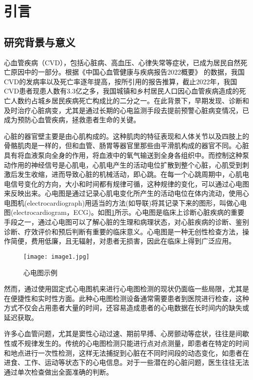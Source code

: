 \section{引言}
\subsection{研究背景与意义}

心血管疾病（CVD），包括心脏病、高血压、心律失常等症状，已成为居民自然死亡原因中的一部分。根据《中国心血管健康与疾病报告2022概要》 \cite{中国心血管健康与疾病报告2022概要} 的数据，我国CVD的发病率以及死亡率逐年提高，按所引用的报告推算，截止2022年，我国CVD患者现患人数有3.3亿之多，我国城镇和乡村居民人口因心血管疾病造成的死亡人数约占城乡居民疾病死亡构成比的二分之一。在此背景下，早期发现、诊断和及时治疗心脏病变，尤其是通过长期的心电监测手段去提前预警心脏病变情况，已成为预防心血管疾病，拯救患者生命的关键。

心脏的器官壁主要是由心肌构成的。这种肌肉的特征表现和人体关节以及四肢上的骨骼肌肉是一样的，但和血管、肠胃等器官里那些由平滑肌构成的器官不同。心脏具有将血液泵向全身的作用，将血液中的氧气输送到全身各组织中。而控制这种泵动作用的神经信号是心肌电，心肌电产生的活动电位扩散到整个心脏，心肌受到刺激后发生收缩，进而导致心脏的机械活动，即心跳。在每一个心跳周期中，心肌电电信号变化的方向，大小和时间都有规律可循，这种规律的变化，可以通过心电图来反映出来。心电图是通过记录心肌电变化所产生的活动电位在体内流动，使用心电图机(electrocardiograph)用适当的方法(如导联)将其记录下来的图形，叫做心电图(electrocardiogram，ECG)。如图\ref{F.ECG_image}所示。心电图是临床上诊断心脏疾病的重要手段之一，通过心电图可以了解心脏的生理和病理状态，对心脏疾病的诊断、鉴别诊断、疗效评价和预后判断有重要的临床意义。心电图是一种无创性检查方法，操作简便，费用低廉，且无辐射，对患者无损害，因此在临床上得到广泛应用。

\begin{figure}[hbt]
    \centering
    \texttt{[image: image1.jpg]}
    \caption{心电图示例}
    \label{F.ECG_image}
\end{figure}

然而，通过使用固定式心电图机来进行心电图检测的现状仍面临一些局限，尤其是在便捷性和实时性方面。此种心电图检测设备通常需要患者到医院进行检查，这种方式不仅会占用患者大量的时间，还容易造成患者的心电数据在长时间内的缺失或延迟获取。

许多心血管问题，尤其是窦性心动过速、期前早搏、心房颤动等症状，往往是间歇性或不规律发生的。传统的心电图检测只能进行点对点测量，即患者在特定的时间和地点进行一次性检测，这样无法捕捉到心脏在不同时间段的动态变化，如患者在进食、工作、运动等状态下的心电信息。对于一些潜在的心脏问题，医生往往无法通过单次检查做出全面准确的判断。

